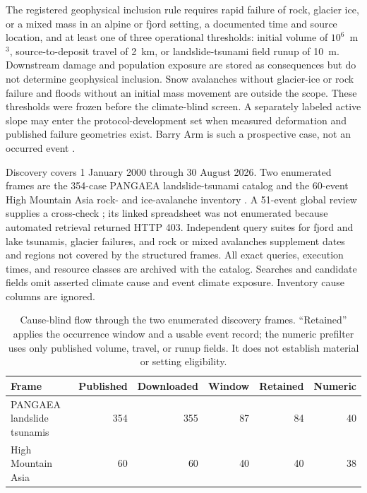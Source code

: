 \documentclass[11pt]{article}
\begin{document}
The registered geophysical inclusion rule requires rapid failure of rock, glacier
ice, or a mixed mass in an alpine or fjord setting, a documented time and
source location, and at least one of three operational thresholds: initial
volume of $10^6$~m$^3$, source-to-deposit travel of 2~km, or landslide-tsunami
field runup of 10~m. Downstream damage and population exposure are stored as
consequences but do not determine geophysical inclusion. Snow avalanches
without glacier-ice or rock failure and floods without an initial mass
movement are outside the scope. These thresholds were frozen before the
climate-blind screen. A separately labeled active
slope may enter the protocol-development set when measured deformation and
published failure geometries exist. Barry Arm is such a prospective case, not
an occurred event \citep{Dai2020,Schaefer2023,Barnhart2021,Collins2024}.

Discovery covers 1 January 2000 through 30 August 2026. Two enumerated frames
are the 354-case PANGAEA landslide-tsunami catalog
\citep{Dohmen2025Data} and the 60-event High Mountain Asia rock- and
ice-avalanche inventory \citep{Zhong2024,Zhong2024Data}. A 51-event global
review supplies a cross-check \citep{Mani2023}; its linked spreadsheet was not
enumerated because automated retrieval returned HTTP 403. Independent query
suites for fjord and lake tsunamis, glacier failures, and rock or mixed
avalanches supplement dates and regions not covered by the structured frames.
All exact queries, execution times, and resource classes are archived with the
catalog. Searches and candidate fields omit asserted climate cause and event
climate exposure. Inventory cause columns are ignored.

\begin{table}[t]
\centering
\caption{Cause-blind flow through the two enumerated discovery frames.
``Retained'' applies the occurrence window and a usable event record; the
numeric prefilter uses only published volume, travel, or runup fields. It does
not establish material or setting eligibility.}\label{tab:frames}
\begin{tabular}{@{}lrrrrr@{}}
\toprule
Frame & Published & Downloaded & Window & Retained & Numeric \\
\midrule
PANGAEA landslide tsunamis & 354 & 355 & 87 & 84 & 40 \\
High Mountain Asia & 60 & 60 & 40 & 40 & 38 \\
\bottomrule
\end{tabular}
\end{table}
\end{document}
